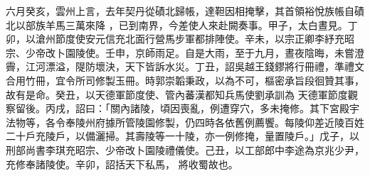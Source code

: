 \begin{pinyinscope}
六月癸亥，雲州上言，去年契丹從磧北歸帳，達靼因相掩擊，其首領裕悅族帳自磧北以部族羊馬三萬來降
 ，已到南界，今差使人來赴闕奏事。甲子，太白晝見。丁卯，以滄州節度使安元信充北面行營馬步軍都排陣使。辛未，以宗正卿李紓充昭宗、少帝改卜園陵使。壬申，京師雨足。自是大雨，至于九月，晝夜陰晦，未嘗澄霽，江河漂溢，隄防壞決，天下皆訴水災。丁丑，詔吳越王錢鏐將行冊禮，準禮文合用竹冊，宜令所司修製玉冊。時郭崇韜秉政，以為不可，樞密承旨段徊贊其事，故有是命。癸丑，以天德軍節度使、管內蕃漢都知兵馬使劉承訓為
 天德軍節度觀察留後。丙戌，詔曰：「關內諸陵，頃因喪亂，例遭穿穴，多未掩修。其下宮殿宇法物等，各令奉陵州府據所管陵園修製，仍四時各依舊例薦饗。每陵仰差近陵百姓二十戶充陵戶，以備灑掃。其壽陵等一十陵，亦一例修掩，量置陵戶。」戊子，以刑部尚書李琪充昭宗、少帝改卜園陵禮儀使。己丑，以工部郎中李途為京兆少尹，充修奉諸陵使。辛卯，詔括天下私馬，
 將收蜀故也。



\end{pinyinscope}